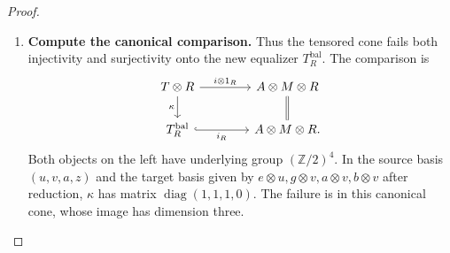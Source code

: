 \documentclass[11pt,reqno]{amsart}
\theoremstyle{plain}
\theoremstyle{definition}
\theoremstyle{remark}
\numberwithin{equation}{section}
\newcommand{\Z}{\mathbb Z}
\begin{document}
\begin{proof}
\begin{enumerate}
\item \textbf{Compute the canonical comparison.} Thus the tensored cone fails both injectivity and surjectivity onto
the new equalizer $T_R^{\mathrm{bal}}$. The comparison is
\[
\begin{tikzcd}[column sep=4em]
T\otimes R \arrow[r,"i\otimes1_R"] \arrow[d,"\kappa"'] &
A\otimes M\otimes R \arrow[d,equal]\\
T_R^{\mathrm{bal}} \arrow[r,hook,"i_R"'] & A\otimes M\otimes R.
\end{tikzcd}
\]
Both objects on the left have underlying group $(\Z/2)^4$.
In the source basis $(u,v,a,z)$ and the target basis given by
$e\otimes u,g\otimes v,a\otimes v,b\otimes v$ after reduction,
$\kappa$ has matrix $\operatorname{diag}(1,1,1,0)$. The failure is in
this canonical cone, whose image has dimension three.\qedhere
\end{enumerate}
\end{proof}
\end{document}
